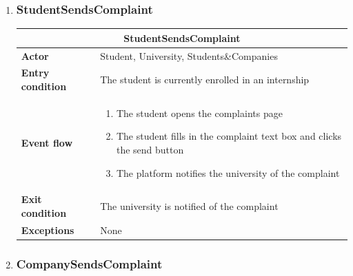 \begin{enumerate}[label=\textbf{UC\arabic* -}]
\item \subsubsection{StudentSendsComplaint}

\begin{table}[H]
    \centering
    \begin{tabular}{|l|m{10cm}|}
        \hline \multicolumn{2}{|c|}{\textbf{StudentSendsComplaint}} \\
        \hline \textbf{Actor} & Student, University, Students\&Companies \\
        \hline \textbf{Entry condition} & The student is currently enrolled in an internship \\
        \hline \textbf{Event flow} &
            \begin{enumerate}[label=\arabic*]
                \item The student opens the complaints page
                \item The student fills in the complaint text box and clicks the send button
                \item The platform notifies the university of the complaint
            \end{enumerate} \\
        \hline \textbf{Exit condition} & The university is notified of the complaint \\
        \hline \textbf{Exceptions} & None \\
        \hline
    \end{tabular}
\end{table}

\item \subsubsection{CompanySendsComplaint}


\end{enumerate}
